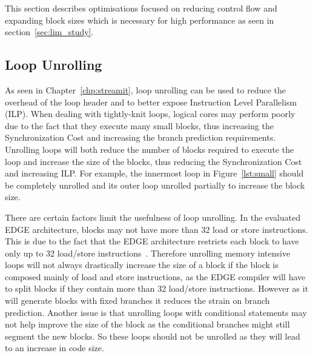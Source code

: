 This section describes optimisations focused on reducing control flow and expanding block sizes which is necessary for high performance as seen in section~\ref{sec:lim_study}.

\subsection{Loop Unrolling}
As seen in Chapter~\ref{chp:streamit}, loop unrolling can be used to reduce the overhead of the loop header and to better expose Instruction Level Parallelism (ILP).
When dealing with tightly-knit loops, logical cores may perform poorly due to the fact that they execute many small blocks, thus increasing the Synchronization Cost and increasing the branch prediction requirements.
Unrolling loops will both reduce the number of blocks required to execute the loop and increase the size of the blocks, thus reducing the Synchronization Cost and increasing ILP.
For example, the innermost loop in Figure~\ref{lst:small} should be completely unrolled and its outer loop unrolled partially to increase the block size.

There are certain factors limit the usefulness of loop unrolling.
In the evaluated EDGE architecture, blocks may not have more than 32 load or store instructions.
This is due to the fact that the EDGE architecture restricts each block to have only up to 32 load/store instructions~\cite{putnam2010e2,smith2006edge}.
Therefore unrolling memory intensive loops will not always drastically increase the size of a block if the block is composed mainly of load and store instructions, as the EDGE compiler will have to split blocks if they contain more than 32 load/store instructions.
However as it will generate blocks with fixed branches it reduces the strain on branch prediction.
Another issue is that unrolling loops with conditional statements may not help improve the size of the block as the conditional branches might still segment the new blocks.
So these loops should not be unrolled as they will lead to an increase in code size.


